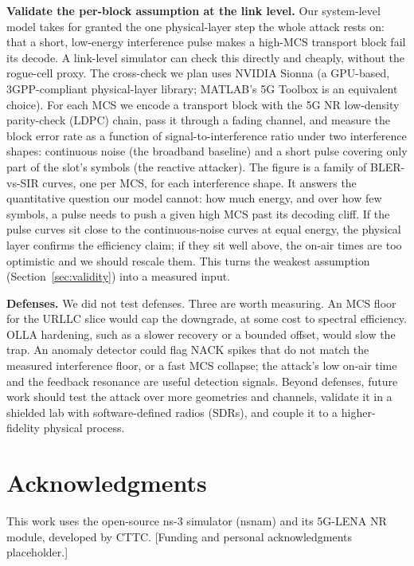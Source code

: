 \documentclass[conference]{IEEEtran}
\begin{document}
\textbf{Validate the per-block assumption at the link level.} Our system-level model
takes for granted the one physical-layer step the whole attack rests on: that a short,
low-energy interference pulse makes a high-MCS transport block fail its decode. A
link-level simulator can check this directly and cheaply, without the rogue-cell proxy.
The cross-check we plan uses NVIDIA Sionna (a GPU-based, 3GPP-compliant physical-layer
library; MATLAB's 5G Toolbox is an equivalent choice). For each MCS we encode a transport
block with the 5G NR low-density parity-check (LDPC) chain, pass it through a fading
channel, and measure the block error rate as a function of signal-to-interference ratio
under two interference shapes: continuous noise (the broadband baseline) and a short
pulse covering only part of the slot's symbols (the reactive attacker). The figure is a
family of BLER-vs-SIR curves, one per MCS, for each interference shape. It answers the
quantitative question our model cannot: how much energy, and over how few symbols, a
pulse needs to push a given high MCS past its decoding cliff. If the pulse curves sit
close to the continuous-noise curves at equal energy, the physical layer confirms the
efficiency claim; if they sit well above, the on-air times are too optimistic and we
should rescale them. This turns the weakest assumption
(Section~\ref{sec:validity}) into a measured input.

\textbf{Defenses.} We did not test defenses. Three are worth measuring. An MCS floor for the URLLC slice
would cap the downgrade, at some cost to spectral efficiency. OLLA hardening, such as a
slower recovery or a bounded offset, would slow the trap. An anomaly detector could
flag NACK spikes that do not match the measured interference floor, or a fast MCS
collapse; the attack's low on-air time and the feedback resonance are useful detection
signals. Beyond defenses, future work should test the attack over more geometries and
channels, validate it in a shielded lab with software-defined radios (SDRs), and couple
it to a higher-fidelity physical process.

\section*{Acknowledgments}
This work uses the open-source ns-3 simulator (nsnam) and its 5G-LENA NR module,
developed by CTTC. [Funding and personal acknowledgments placeholder.]
\end{document}
